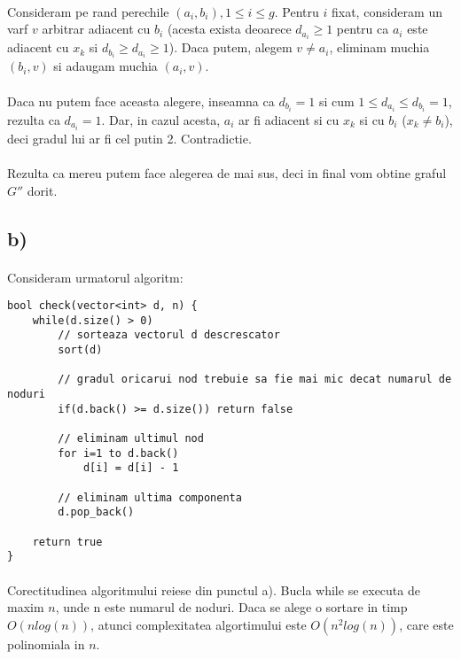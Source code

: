 \documentclass[paper=a4, fontsize=11pt]{scrartcl}
\begin{document}
\paragraph{}
Consideram pe rand perechile $(a_i, b_i), 1\leq i\leq g$. Pentru $i$ fixat, consideram un varf $v$ arbitrar adiacent cu $b_i$ (acesta exista deoarece $d_{a_i} \geq 1$ pentru ca $a_i$ este adiacent cu $x_k$ si $d_{b_i}\geq d_{a_i}\geq 1$). Daca putem, alegem $v\neq a_i$, eliminam muchia $(b_i, v)$ si adaugam muchia $(a_i, v)$.

\paragraph{}
Daca nu putem face aceasta alegere, inseamna ca $d_{b_i} = 1$ si cum $1\leq d_{a_i}\leq d_{b_i} = 1$, rezulta ca $d_{a_i} = 1$. Dar, in cazul acesta, $a_i$ ar fi adiacent si cu $x_k$ si cu $b_i$ ($x_k\neq b_i$), deci gradul lui ar fi cel putin 2. Contradictie.

\paragraph{}
Rezulta ca mereu putem face alegerea de mai sus, deci in final vom obtine graful $G''$ dorit.

\newpage
\subsection*{b)}
\paragraph{}
Consideram urmatorul algoritm:

\begin{lstlisting}
bool check(vector<int> d, n) {
	while(d.size() > 0)
		// sorteaza vectorul d descrescator
		sort(d)
		
		// gradul oricarui nod trebuie sa fie mai mic decat numarul de noduri
		if(d.back() >= d.size()) return false
		
		// eliminam ultimul nod
		for i=1 to d.back()
			d[i] = d[i] - 1
		
		// eliminam ultima componenta
		d.pop_back()
	
	return true
}
\end{lstlisting}

\paragraph{}
Corectitudinea algoritmului reiese din punctul a). Bucla while se executa de maxim $n$, unde n este numarul de noduri. Daca se alege o sortare in timp $O(n log(n))$, atunci complexitatea algortimului este $O(n^2 log(n))$, care este polinomiala in $n$.
\end{document}
